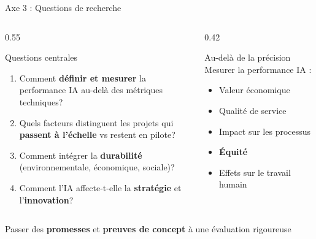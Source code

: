 \documentclass[aspectratio=169,11pt]{beamer}
\begin{document}
\begin{frame}{Axe 3 : Questions de recherche}
  \begin{columns}[T]
    \begin{column}{0.55\textwidth}
      \begin{block}{Questions centrales}
        \begin{enumerate}\small
          \item Comment \textbf{définir et mesurer} la performance IA au-delà des métriques techniques?
          \item Quels facteurs distinguent les projets qui \textbf{passent à l'échelle} vs restent en pilote?
          \item Comment intégrer la \textbf{durabilité} (environnementale, économique, sociale)?
          \item Comment l'IA affecte-t-elle la \textbf{stratégie} et l'\textbf{innovation}?
        \end{enumerate}
      \end{block}
    \end{column}
    \begin{column}{0.42\textwidth}
      \begin{exampleblock}{Au-delà de la précision}
        \small Mesurer la performance IA :
        \begin{itemize}\small
          \item Valeur économique
          \item Qualité de service
          \item Impact sur les processus
          \item \textbf{Équité}
          \item Effets sur le travail humain
        \end{itemize}
      \end{exampleblock}
    \end{column}
  \end{columns}
  
  \vspace{0.3em}
  
  \begin{center}
    {\small\textcolor{axe3color}{Passer des \textbf{promesses} et \textbf{preuves de concept} à une évaluation rigoureuse}}
  \end{center}
\end{frame}
\end{document}
